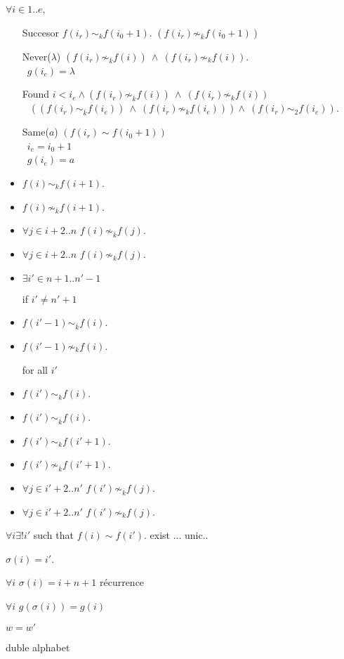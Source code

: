 \documentclass[a4paper,10pt]{article}
\begin{document}
$\forall i \in 1..e$,
\begin{itemize}
 \item [Succesor] $f(i_r) \sim_{k} f(i_0+1)$.
 $(f(i_r) \not \sim_{\overline{k}} f(i_0+1))$
 \item [Never($\lambda$)]  $  (f(i_r) \not \sim_{\overline{k}} f(i)) \  \wedge \ (f(i_r) \not \sim_{k} f(i))  $. \\\
    $g(i_e) = \lambda$
 \item[Found] $i < i_e  \wedge (f(i_r) \not \sim_{\overline{k}} f(i)) \  \wedge \ (f(i_r)  \not \sim_{k} f(i)) $ \\\
    $ \  ((f(i_r)  \sim_{\overline{k}} f(i_e)) \  \wedge \ (f(i_r) \not \sim_{k} f(i_e))) \wedge \ (f(i_r)  \sim_{2} f(i_e))$.
 \item[Same($a$)] $(f(i_r) \sim f(i_0+ 1))$ \\\
  $i_e = i_0 +1$ \\\
  $g(i_e) = a$
 
\end{itemize}

\begin{itemize}
 \item $f(i) \sim_k f(i +1)$. 
 \item $f(i) \not \sim_{\overline k} f(i +1)$.
 \item $\forall j \in  i+2..n$ $f(i) \not \sim_{\overline k} f(j)$. 
 \item $\forall j \in  i+2..n$ $f(i) \not \sim_{k} f(j)$.

 \item $\exists i' \in n+1..n'-1$ 
 
 if $i' \neq n'+1$ 
 \item $f(i'-1) \sim_{\overline k} f(i)$.
 \item $f(i'-1)  \not \sim_{k} f(i)$.
 
 for all  $i'$ 
 \item $f(i') \sim_{k} f(i)$.
 \item $f(i') \sim_{\overline k} f(i)$.
 \item $f(i') \sim_k f(i' +1)$. 
 \item $f(i') \not \sim_{\overline k} f(i' +1)$.
 \item $\forall j \in  i'+2..n'$ $f(i') \not \sim_{\overline k} f(j)$. 
 \item $\forall j \in  i'+2..n'$ $f(i') \not \sim_{k} f(j)$.
 
 
\end{itemize}

$\forall i \exists  ! i' $ such that $f(i) \sim f(i')$.
exist ... 
unic..


$\sigma(i) = i'$.


$\forall i $ $\sigma(i) = i+n+1$
récurrence

$\forall i $ $g(\sigma(i)) = g(i)$


$w = w'$

duble alphabet 
\end{document}

